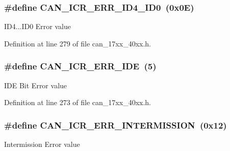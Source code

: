 \subsubsection[{\texorpdfstring{C\+A\+N\+\_\+\+I\+C\+R\+\_\+\+E\+R\+R\+\_\+\+I\+D4\+\_\+\+I\+D0}{CAN_ICR_ERR_ID4_ID0}}]{\setlength{\rightskip}{0pt plus 5cm}\#define C\+A\+N\+\_\+\+I\+C\+R\+\_\+\+E\+R\+R\+\_\+\+I\+D4\+\_\+\+I\+D0~(0x0\+E)}\hypertarget{group__CAN__17XX__40XX_ga0f52fa1bf8a31f19e4085bc35b5164cd}{}\label{group__CAN__17XX__40XX_ga0f52fa1bf8a31f19e4085bc35b5164cd}
I\+D4...I\+D0 Error value 

Definition at line 279 of file can\+\_\+17xx\+\_\+40xx.\+h.

\subsubsection[{\texorpdfstring{C\+A\+N\+\_\+\+I\+C\+R\+\_\+\+E\+R\+R\+\_\+\+I\+DE}{CAN_ICR_ERR_IDE}}]{\setlength{\rightskip}{0pt plus 5cm}\#define C\+A\+N\+\_\+\+I\+C\+R\+\_\+\+E\+R\+R\+\_\+\+I\+DE~(5)}\hypertarget{group__CAN__17XX__40XX_ga2267eddf693f953aa6069d8c47b16325}{}\label{group__CAN__17XX__40XX_ga2267eddf693f953aa6069d8c47b16325}
I\+DE Bit Error value 

Definition at line 273 of file can\+\_\+17xx\+\_\+40xx.\+h.

\subsubsection[{\texorpdfstring{C\+A\+N\+\_\+\+I\+C\+R\+\_\+\+E\+R\+R\+\_\+\+I\+N\+T\+E\+R\+M\+I\+S\+S\+I\+ON}{CAN_ICR_ERR_INTERMISSION}}]{\setlength{\rightskip}{0pt plus 5cm}\#define C\+A\+N\+\_\+\+I\+C\+R\+\_\+\+E\+R\+R\+\_\+\+I\+N\+T\+E\+R\+M\+I\+S\+S\+I\+ON~(0x12)}\hypertarget{group__CAN__17XX__40XX_gafd3bd849f9878685f2493810f74828ef}{}\label{group__CAN__17XX__40XX_gafd3bd849f9878685f2493810f74828ef}
Intermission Error value 


